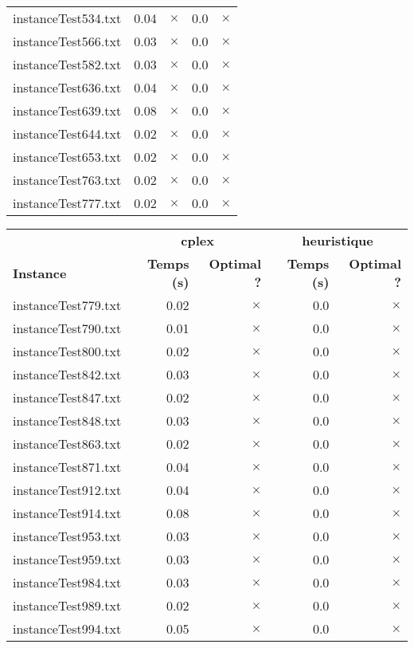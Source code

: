 \documentclass{article}
\begin{document}
\begin{center}
\begin{tabular}{lrrrr}
instanceTest534.txt & 0.04 & 
$\times$
 & 0.0 & 
$\times$
\\
instanceTest566.txt & 0.03 & 
$\times$
 & 0.0 & 
$\times$
\\
instanceTest582.txt & 0.03 & 
$\times$
 & 0.0 & 
$\times$
\\
instanceTest636.txt & 0.04 & 
$\times$
 & 0.0 & 
$\times$
\\
instanceTest639.txt & 0.08 & 
$\times$
 & 0.0 & 
$\times$
\\
instanceTest644.txt & 0.02 & 
$\times$
 & 0.0 & 
$\times$
\\
instanceTest653.txt & 0.02 & 
$\times$
 & 0.0 & 
$\times$
\\
instanceTest763.txt & 0.02 & 
$\times$
 & 0.0 & 
$\times$
\\
instanceTest777.txt & 0.02 & 
$\times$
 & 0.0 & 
$\times$
\\
\hline\end{tabular}
\end{center}

\newpage
\begin{center}
\renewcommand{\arraystretch}{1.4} 
 \begin{tabular}{lrrrr}
	\hline
 & \multicolumn{2}{c}{\textbf{cplex}} & \multicolumn{2}{c}{\textbf{heuristique}}\\
\textbf{Instance}  & \textbf{Temps (s)} & \textbf{Optimal ?}  & \textbf{Temps (s)} & \textbf{Optimal ?} \\\hline

instanceTest779.txt & 0.02 & 
$\times$
 & 0.0 & 
$\times$
\\
instanceTest790.txt & 0.01 & 
$\times$
 & 0.0 & 
$\times$
\\
instanceTest800.txt & 0.02 & 
$\times$
 & 0.0 & 
$\times$
\\
instanceTest842.txt & 0.03 & 
$\times$
 & 0.0 & 
$\times$
\\
instanceTest847.txt & 0.02 & 
$\times$
 & 0.0 & 
$\times$
\\
instanceTest848.txt & 0.03 & 
$\times$
 & 0.0 & 
$\times$
\\
instanceTest863.txt & 0.02 & 
$\times$
 & 0.0 & 
$\times$
\\
instanceTest871.txt & 0.04 & 
$\times$
 & 0.0 & 
$\times$
\\
instanceTest912.txt & 0.04 & 
$\times$
 & 0.0 & 
$\times$
\\
instanceTest914.txt & 0.08 & 
$\times$
 & 0.0 & 
$\times$
\\
instanceTest953.txt & 0.03 & 
$\times$
 & 0.0 & 
$\times$
\\
instanceTest959.txt & 0.03 & 
$\times$
 & 0.0 & 
$\times$
\\
instanceTest984.txt & 0.03 & 
$\times$
 & 0.0 & 
$\times$
\\
instanceTest989.txt & 0.02 & 
$\times$
 & 0.0 & 
$\times$
\\
instanceTest994.txt & 0.05 & 
$\times$
 & 0.0 & 
$\times$
\\
\hline\end{tabular}
\end{center}
\end{document}
